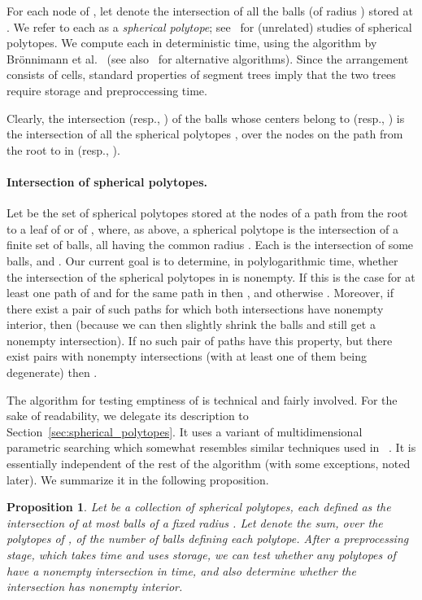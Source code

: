 \documentclass[a4paper,12pt]{article}
\newtheorem{proposition}[theorem]{Proposition}
\begin{document}
For each node  of , let  denote the intersection of all
the balls (of radius ) stored at . We refer to each  as a
\emph{spherical polytope}; see~\cite{BCT, BLNP, BN} for (unrelated)
studies of spherical polytopes. We compute each  in  deterministic time, using the algorithm by
Br\"{o}nnimann et al.~\cite{BCM} (see also~\cite{CS, ER} for
alternative algorithms). Since the arrangement  consists of
 cells, standard properties of segment trees imply that the
two trees require  storage and 
preproccessing time.

Clearly, the intersection  (resp., ) of
the balls whose centers belong to  (resp., ) is
the intersection of all the spherical polytopes , over the
nodes  on the path from the root to  in  (resp.,
).

\paragraph{Intersection of spherical polytopes.}
Let  be the set of 
spherical polytopes stored at the nodes of a path from the root to a
leaf of  or of , where, as above, a spherical polytope is
the intersection of a finite set of balls, all having the common
radius . Each  is the intersection of some  balls, and
. Our current goal is to determine, in
polylogarithmic time, whether the intersection  of the spherical
polytopes in  is nonempty. If this is the case for at least one
path of  and for the same path in  then , and
otherwise . Moreover, if there exist a pair of such paths
for which both intersections have nonempty interior, then 
(because we can then slightly shrink the balls and still get a
nonempty intersection). If no such pair of paths have this property,
but there exist pairs with nonempty intersections (with at least one
of them being degenerate) then .

The algorithm for testing emptiness of  is technical and fairly
involved. For the sake of readability, we delegate its description
to Section~\ref{sec:spherical_polytopes}. It uses a variant of
multidimensional parametric searching which somewhat resembles
similar techniques used in ~\cite{TCA, CMS, JM, NPT}. It is
essentially independent of the rest of the algorithm (with some
exceptions, noted later). We summarize it in the following
proposition.

\begin{proposition}
\label{prop:intersection_test} Let  be a collection of spherical
polytopes, each defined as the intersection of at most  balls of
a fixed radius . Let  denote the sum, over the polytopes of
, of the number of balls defining each polytope. After a
preprocessing stage, which takes  time and uses 
storage, we can test whether any  polytopes of 
have a nonempty intersection in  time, and also
determine whether the intersection has nonempty interior.
\end{proposition}
\end{document}
